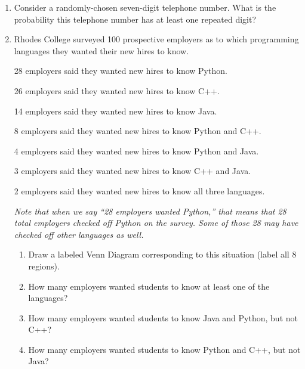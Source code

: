 \documentclass[11pt, letterpaper]{report}
\begin{document}
\begin{enumerate}
\item Consider a randomly-chosen seven-digit telephone number.  What is the probability this telephone number has at least one repeated digit?




\item Rhodes College surveyed 100 prospective employers as to which programming languages
they wanted their new hires to know.  

28 employers said they wanted new hires to know Python.

26 employers said they wanted new hires to know C++.  

14 employers said they wanted new hires to know Java.

8 employers said they wanted new hires to know Python and C++.

4 employers said they wanted new hires to know Python and Java.

3 employers said they wanted new hires to know C++ and Java.

2 employers said they wanted new hires to know all three languages.

\emph{Note that when we say ``28 employers wanted Python,'' that means that 28 total employers checked off Python
on the survey.  Some of those 28 may have checked off other languages as well.}

\begin{enumerate}

        \item Draw a labeled Venn Diagram corresponding to this situation (label all 8 regions).
        
        \item How many employers wanted students to know at least one of the languages?
        
        \item How many employers wanted students to know Java and Python, but not C++?
        
        \item How many employers wanted students to know Python and C++, but not Java?

\end{enumerate}


\end{enumerate}
\end{document}
